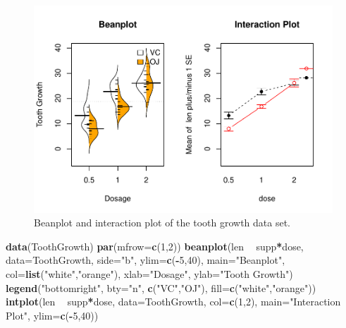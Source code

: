 \documentclass[]{book}
\newenvironment{Shaded}{\begin{snugshade}}{\end{snugshade}}
\newcommand{\KeywordTok}[1]{\textcolor[rgb]{0.13,0.29,0.53}{\textbf{#1}}}
\newcommand{\DataTypeTok}[1]{\textcolor[rgb]{0.13,0.29,0.53}{#1}}
\newcommand{\DecValTok}[1]{\textcolor[rgb]{0.00,0.00,0.81}{#1}}
\newcommand{\StringTok}[1]{\textcolor[rgb]{0.31,0.60,0.02}{#1}}
\newcommand{\OperatorTok}[1]{\textcolor[rgb]{0.81,0.36,0.00}{\textbf{#1}}}
\newcommand{\NormalTok}[1]{#1}
\theoremstyle{definition}
\theoremstyle{definition}
\theoremstyle{remark}
\begin{document}
\begin{figure}
\centering
\includegraphics{04-twoWayAnova_files/figure-latex/Figure4-8-1.pdf}
\caption{\label{fig:Figure4-8}Beanplot and interaction plot of the tooth growth data set.}
\end{figure}

\begin{Shaded}
\begin{Highlighting}[]
\KeywordTok{data}\NormalTok{(ToothGrowth)}
\KeywordTok{par}\NormalTok{(}\DataTypeTok{mfrow=}\KeywordTok{c}\NormalTok{(}\DecValTok{1}\NormalTok{,}\DecValTok{2}\NormalTok{))}
\KeywordTok{beanplot}\NormalTok{(len }\OperatorTok{~}\StringTok{ }\NormalTok{supp}\OperatorTok{*}\NormalTok{dose, }\DataTypeTok{data=}\NormalTok{ToothGrowth, }\DataTypeTok{side=}\StringTok{"b"}\NormalTok{, }\DataTypeTok{ylim=}\KeywordTok{c}\NormalTok{(}\OperatorTok{-}\DecValTok{5}\NormalTok{,}\DecValTok{40}\NormalTok{),}
         \DataTypeTok{main=}\StringTok{"Beanplot"}\NormalTok{, }\DataTypeTok{col=}\KeywordTok{list}\NormalTok{(}\StringTok{"white"}\NormalTok{,}\StringTok{"orange"}\NormalTok{), }\DataTypeTok{xlab=}\StringTok{"Dosage"}\NormalTok{,}
         \DataTypeTok{ylab=}\StringTok{"Tooth Growth"}\NormalTok{)}
\KeywordTok{legend}\NormalTok{(}\StringTok{"bottomright"}\NormalTok{, }\DataTypeTok{bty=}\StringTok{"n"}\NormalTok{, }\KeywordTok{c}\NormalTok{(}\StringTok{"VC"}\NormalTok{,}\StringTok{"OJ"}\NormalTok{), }\DataTypeTok{fill=}\KeywordTok{c}\NormalTok{(}\StringTok{"white"}\NormalTok{,}\StringTok{"orange"}\NormalTok{))}
\KeywordTok{intplot}\NormalTok{(len }\OperatorTok{~}\StringTok{ }\NormalTok{supp}\OperatorTok{*}\NormalTok{dose, }\DataTypeTok{data=}\NormalTok{ToothGrowth, }\DataTypeTok{col=}\KeywordTok{c}\NormalTok{(}\DecValTok{1}\NormalTok{,}\DecValTok{2}\NormalTok{), }
        \DataTypeTok{main=}\StringTok{"Interaction Plot"}\NormalTok{, }\DataTypeTok{ylim=}\KeywordTok{c}\NormalTok{(}\OperatorTok{-}\DecValTok{5}\NormalTok{,}\DecValTok{40}\NormalTok{))}
\end{Highlighting}
\end{Shaded}
\end{document}
